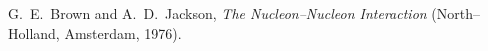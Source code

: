 \documentclass[12pt]{report}
\begin{document}
\begin{thebibliography}{99}


  G.~E.~Brown and A.~D.~Jackson, {\it The
Nucleon--Nucleon Interaction} (North--Holland, Amsterdam, 1976).

\end{thebibliography}


\appendix

\chapter{}



\newpage


\vitapage
\end{document}
